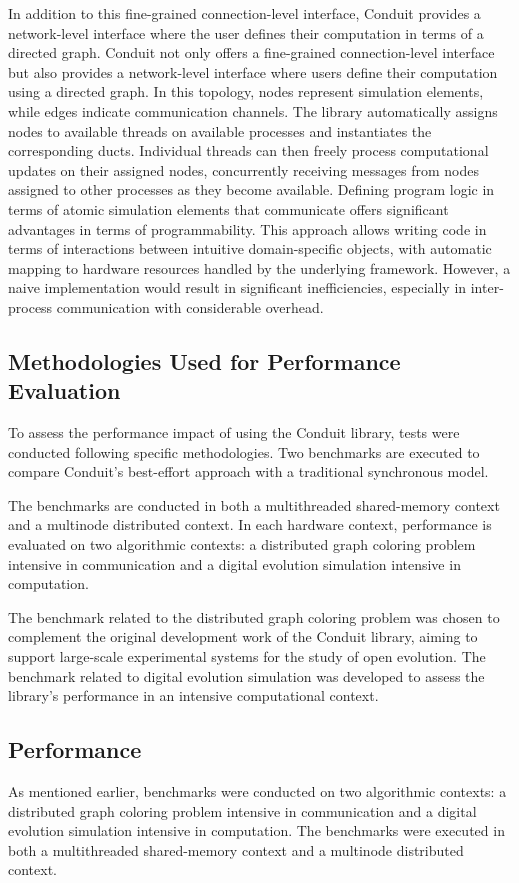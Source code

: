 \documentclass[11pt]{article}
\begin{document}
\begin{multicols*}{2}[\columnsep=1cm]
    In addition to this fine-grained connection-level interface, Conduit provides a network-level interface where the user defines their computation in terms of a directed graph. Conduit not only offers a fine-grained connection-level interface but also provides a network-level interface where users define their computation using a directed graph. In this topology, nodes represent simulation elements, while edges indicate communication channels. The library automatically assigns nodes to available threads on available processes and instantiates the corresponding ducts. Individual threads can then freely process computational updates on their assigned nodes, concurrently receiving messages from nodes assigned to other processes as they become available.
    Defining program logic in terms of atomic simulation elements that communicate offers significant advantages in terms of programmability. This approach allows writing code in terms of interactions between intuitive domain-specific objects, with automatic mapping to hardware resources handled by the underlying framework.
    However, a naive implementation would result in significant inefficiencies, especially in inter-process communication with considerable overhead.
    
    \subsection{Methodologies Used for Performance Evaluation}
    To assess the performance impact of using the Conduit library, tests were conducted following specific methodologies. Two benchmarks are executed to compare Conduit's best-effort approach with a traditional synchronous model.
    
    The benchmarks are conducted in both a multithreaded shared-memory context and a multinode distributed context. In each hardware context, performance is evaluated on two algorithmic contexts: a distributed graph coloring problem intensive in communication and a digital evolution simulation intensive in computation.
    
    The benchmark related to the distributed graph coloring problem was chosen to complement the original development work of the Conduit library, aiming to support large-scale experimental systems for the study of open evolution. The benchmark related to digital evolution simulation was developed to assess the library's performance in an intensive computational context.
    
    \subsection{Performance}
    As mentioned earlier, benchmarks were conducted on two algorithmic contexts: a distributed graph coloring problem intensive in communication and a digital evolution simulation intensive in computation. The benchmarks were executed in both a multithreaded shared-memory context and a multinode distributed context.
    

\end{multicols*}
\end{document}

